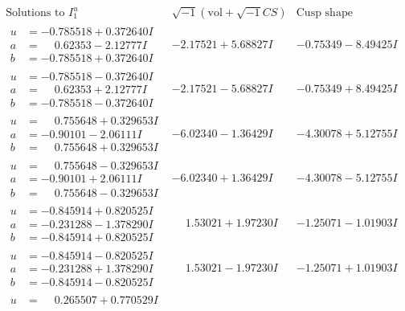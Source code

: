 \documentclass[1p]{elsarticle_modified}
\theoremstyle{definition}
\newcommand{\I}{\sqrt{-1}}
\begin{document}
$$\begin{array}{c|c|c}  
\text{Solutions to }I^u_{1}& \I (\text{vol} + \sqrt{-1}CS) & \text{Cusp shape}\\
 \hline 
\begin{aligned}
u &= -0.785518 + 0.372640 I \\
a &= \phantom{-}0.62353 - 2.12777 I \\
b &= -0.785518 + 0.372640 I\end{aligned}
 & -2.17521 + 5.68827 I & -0.75349 - 8.49425 I \\ \hline\begin{aligned}
u &= -0.785518 - 0.372640 I \\
a &= \phantom{-}0.62353 + 2.12777 I \\
b &= -0.785518 - 0.372640 I\end{aligned}
 & -2.17521 - 5.68827 I & -0.75349 + 8.49425 I \\ \hline\begin{aligned}
u &= \phantom{-}0.755648 + 0.329653 I \\
a &= -0.90101 - 2.06111 I \\
b &= \phantom{-}0.755648 + 0.329653 I\end{aligned}
 & -6.02340 - 1.36429 I & -4.30078 + 5.12755 I \\ \hline\begin{aligned}
u &= \phantom{-}0.755648 - 0.329653 I \\
a &= -0.90101 + 2.06111 I \\
b &= \phantom{-}0.755648 - 0.329653 I\end{aligned}
 & -6.02340 + 1.36429 I & -4.30078 - 5.12755 I \\ \hline\begin{aligned}
u &= -0.845914 + 0.820525 I \\
a &= -0.231288 - 1.378290 I \\
b &= -0.845914 + 0.820525 I\end{aligned}
 & \phantom{-}1.53021 + 1.97230 I & -1.25071 - 1.01903 I \\ \hline\begin{aligned}
u &= -0.845914 - 0.820525 I \\
a &= -0.231288 + 1.378290 I \\
b &= -0.845914 - 0.820525 I\end{aligned}
 & \phantom{-}1.53021 - 1.97230 I & -1.25071 + 1.01903 I \\ \hline\begin{aligned}
u &= \phantom{-}0.265507 + 0.770529 I \\

\end{aligned}
\end{array}$$
\end{document}
